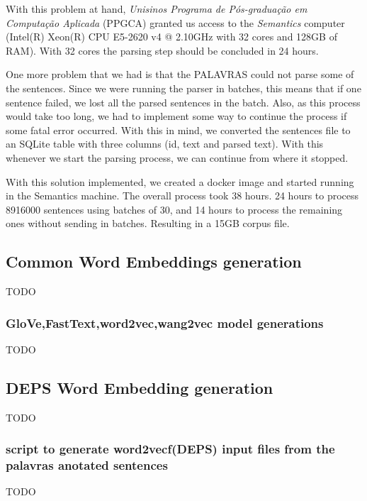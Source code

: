 With this problem at hand, \textit{Unisinos Programa de Pós-graduação em Computação Aplicada} (PPGCA) granted us access to the \textit{Semantics} computer (Intel(R) Xeon(R) CPU E5-2620 v4 @ 2.10GHz with 32 cores and 128GB of RAM). With 32 cores the parsing step should be concluded in 24 hours.

One more problem that we had is that the PALAVRAS could not parse some of the sentences. Since we were running the parser in batches, this means that if one sentence failed, we lost all the parsed sentences in the batch. Also, as this process would take too long, we had to implement some way to continue the process if some fatal error occurred. With this in mind, we converted the sentences file to an SQLite table with three columns (id, text and parsed text). With this whenever we start the parsing process, we can continue from where it stopped.

With this solution implemented, we created a docker image and started running in the Semantics machine. The overall process took 38 hours. 24 hours to process 8916000 sentences using batches of 30, and 14 hours to process the remaining ones without sending in batches. Resulting in a 15GB corpus file.

\subsection{Common Word Embeddings generation}

TODO

\subsubsection{GloVe,FastText,word2vec,wang2vec model generations}

TODO

\subsection{DEPS Word Embedding generation}

TODO

\subsubsection{script to generate word2vecf(DEPS) input files from the palavras anotated sentences}

TODO

